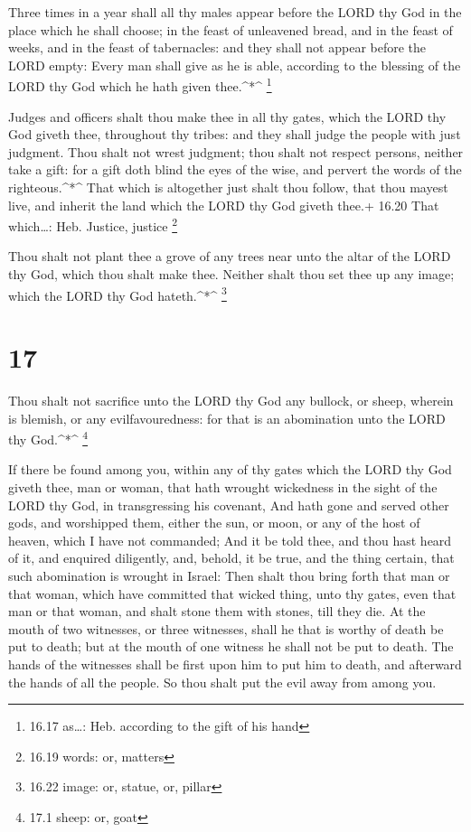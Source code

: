  Three times in a year shall all thy males appear before
the LORD thy God in the place which he shall choose; in the feast of
unleavened bread, and in the feast of weeks, and in the feast of
tabernacles: and they shall not appear before the LORD empty:
 Every man shall give as he is able, according to the
blessing of the LORD thy God which he hath given thee.\^{}*\^{}
\footnote{16.17 as\ldots: Heb. according to the gift of his hand}

 Judges and officers shalt thou make thee in all thy gates,
which the LORD thy God giveth thee, throughout thy tribes: and they
shall judge the people with just judgment.  Thou shalt not
wrest judgment; thou shalt not respect persons, neither take a gift: for
a gift doth blind the eyes of the wise, and pervert the words of the
righteous.\^{}*\^{}  That which is altogether just shalt
thou follow, that thou mayest live, and inherit the land which the LORD
thy God giveth thee.+ 16.20 That which\ldots: Heb. Justice, justice
\footnote{16.19 words: or, matters}

 Thou shalt not plant thee a grove of any trees near unto
the altar of the LORD thy God, which thou shalt make thee. 
Neither shalt thou set thee up any image; which the LORD thy God
hateth.\^{}*\^{} \footnote{16.22 image: or, statue, or, pillar}

\hypertarget{section-16}{%
\section{17}\label{section-16}}

 Thou shalt not sacrifice unto the LORD thy God any bullock,
or sheep, wherein is blemish, or any evilfavouredness: for that is an
abomination unto the LORD thy God.\^{}*\^{} \footnote{17.1 sheep: or,
  goat}

 If there be found among you, within any of thy gates which
the LORD thy God giveth thee, man or woman, that hath wrought wickedness
in the sight of the LORD thy God, in transgressing his covenant,
 And hath gone and served other gods, and worshipped them,
either the sun, or moon, or any of the host of heaven, which I have not
commanded;  And it be told thee, and thou hast heard of it,
and enquired diligently, and, behold, it be true, and the thing certain,
that such abomination is wrought in Israel:  Then shalt thou
bring forth that man or that woman, which have committed that wicked
thing, unto thy gates, even that man or that woman, and shalt stone them
with stones, till they die.  At the mouth of two witnesses,
or three witnesses, shall he that is worthy of death be put to death;
but at the mouth of one witness he shall not be put to death.
 The hands of the witnesses shall be first upon him to put
him to death, and afterward the hands of all the people. So thou shalt
put the evil away from among you.

